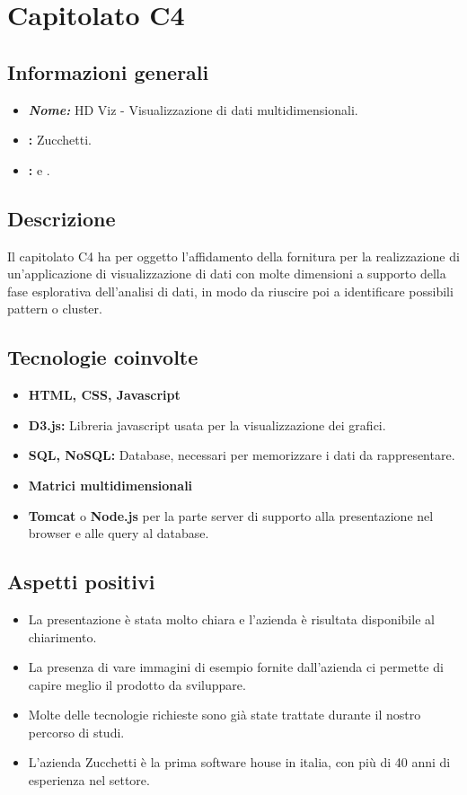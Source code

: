 \section{Capitolato C4}

\subsection{Informazioni generali}
\begin{itemize}
\item \textbf{\emph{Nome:}} HD Viz - Visualizzazione di dati multidimensionali.
\item \textbf{\commitProg:} Zucchetti.
\item \textbf{\proponProg:} \VT{} e \CR.
\end{itemize}

\subsection{Descrizione}
Il capitolato C4 ha per oggetto l’affidamento della fornitura per la realizzazione di un'applicazione di visualizzazione di dati con molte dimensioni a supporto della fase esplorativa dell'analisi di dati, in modo da riuscire poi a identificare possibili pattern o cluster.

\subsection{Tecnologie coinvolte}
\begin{itemize}
\item \textbf{HTML, CSS, Javascript} 
\item \textbf{D3.js:} Libreria javascript usata per la visualizzazione dei grafici.
\item \textbf{SQL, NoSQL:} Database, necessari per memorizzare i dati da rappresentare.
\item \textbf{Matrici multidimensionali}
\item \textbf{Tomcat} o \textbf{Node.js} per la parte server di supporto alla presentazione nel browser e alle query al database.
\end{itemize}

\subsection{Aspetti positivi}
\begin{itemize}
\item La presentazione è stata molto chiara e l’azienda è risultata disponibile al chiarimento.
\item La presenza di vare immagini di esempio fornite dall'azienda ci permette di capire meglio il prodotto da sviluppare.
\item Molte delle tecnologie richieste sono già state trattate durante il nostro percorso di studi.
\item L’azienda Zucchetti è la prima software house in italia, con più di 40 anni di esperienza nel settore.
\end{itemize}

